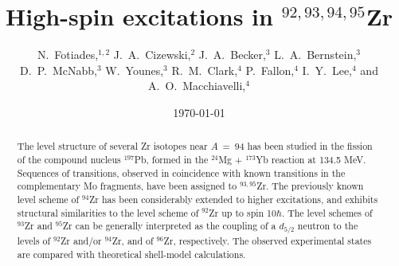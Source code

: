 %
% 
% 
%
%   
%
%

\draft
{}
\title{ High-spin excitations in $^{92,93,94,95}$Zr }
\author{N.~Fotiades,$^{1,2}$ J.~A.~Cizewski,$^2$ J.~A.~Becker,$^3$
 L.~A.~Bernstein,$^3$ D.~P.~McNabb,$^3$ W.~Younes,$^3$ R.~M.~Clark,$^4$
 P.~Fallon,$^4$ I.~Y.~Lee,$^4$ and A.~O.~Macchiavelli,$^4$  }

\address{$^{1}$Los Alamos National Laboratory, Los Alamos, New Mexico 87545 }
\address{$^{2}$Department of Physics and Astronomy, Rutgers University, New Brunswick, New Jersey 08903}
\address{$^{3}$Lawrence Livermore National Laboratory, Livermore, California 94550}
\address{$^{4}$Nuclear Science Division, Lawrence Berkeley National Laboratory, Berkeley, California 94720}

\date{\today}

\maketitle

\begin{abstract}
The level structure of several Zr isotopes near $A$~=~94 has been studied in
the fission of the compound nucleus $^{197}$Pb, formed in the $^{24}$Mg +
$^{173}$Yb reaction at 134.5 MeV. Sequences of transitions, observed in
coincidence with known transitions in the complementary Mo fragments, have been
assigned to $^{93,95}$Zr. The previously known level scheme of
$^{94}$Zr has been considerably extended to higher excitations, and exhibits
structural similarities to the level scheme of $^{92}$Zr up to spin 10$\hbar$.
The level schemes of $^{93}$Zr and $^{95}$Zr can be generally interpreted as
the coupling of a $d_{5/2}$ neutron to the levels of $^{92}$Zr and/or
$^{94}$Zr, and of $^{96}$Zr, respectively. The observed experimental states are
compared with theoretical shell-model calculations.
\end{abstract}

